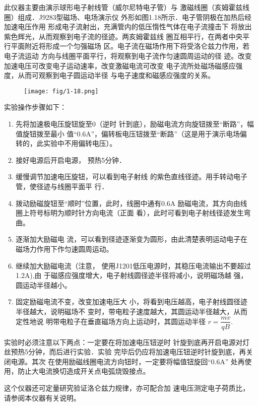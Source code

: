 此仪器主要由演示球形电子射线管（威尔尼特电子管）与
激磁线圈（亥姆霍兹线圈）组成．J9283型磁场、电场演示仪
外形如图1.18所示．电子管阴极在加热后经加速电压作用
形成电子流射出，充满管内的低压惰性气体在电子流撞击下
将放出紫色辉光，从而观察到电子流的径迹。两亥姆霍兹线
圈互相平行，在两者中央平行平面附近将形成一个匀强磁场
区。电子流在磁场作用下将受洛仑兹力作用，若电子流运动
方向与线圈平面平行，将观察到电子流作匀速圆周运动的径
迹。改变加速电压可改变电子运动速率，改变激磁电流可改变
电子流所处磁场磁感应强度，从而可观察到电子圆运动半径
与电子速度和磁感应强度的关系。
\begin{figure}[htp]
    \centering
\texttt{[image: fig/1-18.png]}
    \caption{}
\end{figure}

实验操作步骤如下：
\begin{enumerate}
\item 先将加速极电压旋钮旋至0（逆时
针到底），励磁电流方向旋钮拨至“断路”，幅值旋钮拨至最小
值“0.6A”，偏转板电压钮拨至“断路”（这是用于演示电场偏
转的，此实验中不用偏转电压）。
    \item 接好电源后开启电源，
预热5分钟．
    \item 缓慢调节加速电压旋钮，可以看到电子射线
的紫色直线径迹。用手转动电子管，使径迹与线圈平面平
行．
    \item 拨动励磁旋钮至“顺时”位置，此时，线圈中通有0.6A
励磁电流，其方向由线圈上符号标明为顺时针方向电流（正面
看），此时可看到电子射线径迹发生弯曲。
\item 逐渐加大励磁电
流，可以看到径迹逐渐变为圆形，由此清楚表明运动电子在
磁场力作用下作匀速圆周运动。
\item 继续加大励磁电流（注意，
使用J1201低压电源时，其稳压电流输出不要超过1.2A),由
于磁感应强度增大，电子射线圆径迹半径将减小，说明磁场越
强，圆运动半径越小。
\item 固定励磁电流不变，改变加速电压大
小，将看到电压越高，电子射线圆径迹半径越大，说明磁场不
变时，带电粒子速度越大，其圆运动半径越大，从而定性地说
明带电粒子在垂直磁场方向上运动时，其圆运动半径
$r=\dfrac{mv}{qB}$.
\end{enumerate}

实验时必须注意以下两点：一定要在将加速电压钮逆时
针旋到底再开启电源对灯丝预热5分钟，而后进行实验．实验
完毕后仍应将加速电压钮逆时针旋到底，再关闭电源。其次
在使用励磁线圈电流方向钮时，一定要将幅值钮旋回“0.6A”
处再使用，防止大电流换切造成开关点电弧烧毁接点。

这个仪器还可定量研究验证洛仑兹力规律，亦可配合加
速电压测定电子荷质比，请参阅本仪器有关说明。

